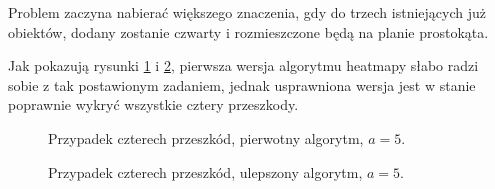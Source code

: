 Problem zaczyna nabierać większego znaczenia, gdy do trzech istniejących już obiektów, dodany zostanie czwarty i rozmieszczone będą na planie prostokąta.

Jak pokazują rysunki \ref{fig:scene_heatmap_5_rect_case} i \ref{fig:scene_heatmap2_5_rect_case}, pierwsza wersja algorytmu heatmapy słabo radzi sobie z tak postawionym zadaniem, jednak usprawniona wersja jest w stanie poprawnie wykryć wszystkie cztery przeszkody.

\begin{figure}
 \centering
 \makebox[\textwidth][r]{
  \resizebox{.9\largefigure}{!}{
    \def\svgwidth{0.9\largefigure}
    
  }
 }
 \caption{Przypadek czterech przeszkód, pierwotny algorytm, $a = 5$.}
 \label{fig:scene_heatmap_5_rect_case}
\end{figure}

\begin{figure}
 \centering
 \makebox[\textwidth][r]{
  \resizebox{.9\largefigure}{!}{
    \def\svgwidth{0.9\largefigure}
    
  }
 }
 \caption{Przypadek czterech przeszkód, ulepszony algorytm, $a = 5$.}
 \label{fig:scene_heatmap2_5_rect_case}
\end{figure}
